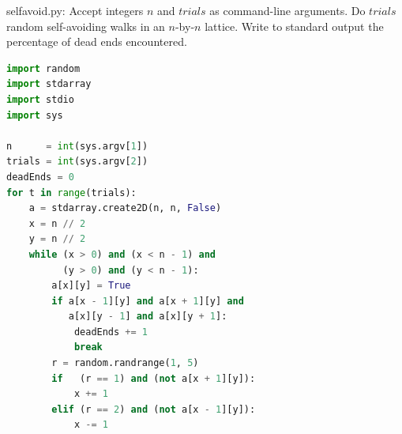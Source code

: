 \documentclass[8pt,a4paper,compress]{beamer}
\begin{document}
\begin{frame}[fragile]
\pause

\begin{framed}
\tiny selfavoid.py: Accept integers $n$ and $trials$ as command-line arguments. Do $trials$ random self-avoiding walks in an $n$-by-$n$ lattice. Write to standard output the percentage of dead ends encountered.
\end{framed}

\begin{minipage}{190pt}
\begin{lstlisting}[language=Python,style=focusin]
import random
import stdarray
import stdio
import sys

n      = int(sys.argv[1])
trials = int(sys.argv[2])
deadEnds = 0
for t in range(trials):
    a = stdarray.create2D(n, n, False)
    x = n // 2
    y = n // 2
    while (x > 0) and (x < n - 1) and 
          (y > 0) and (y < n - 1):
        a[x][y] = True
        if a[x - 1][y] and a[x + 1][y] and 
           a[x][y - 1] and a[x][y + 1]:
            deadEnds += 1
            break
        r = random.randrange(1, 5)
        if   (r == 1) and (not a[x + 1][y]):
            x += 1
        elif (r == 2) and (not a[x - 1][y]):
            x -= 1
\end{lstlisting}
\end{minipage}%
\begin{minipage}{110pt}
\hfill {}
\end{minipage}
\end{frame}
\end{document}
